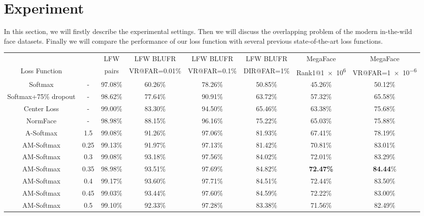 \documentclass[10pt,twocolumn,letterpaper]{article}
\begin{document}
\section{Experiment}

In this section, we will firstly describe the experimental settings. Then we will discuss the overlapping problem of the modern in-the-wild face datasets. Finally we will compare the performance of our loss function with several previous state-of-the-art loss functions.

\begin{table*}
	\centering
	\footnotesize
	\begin{threeparttable}
		\label{tab:performance}
		\begin{tabular}{cccccccc}
			\toprule
			& & LFW\cite{huang2007labeled} & LFW BLUFR\cite{liao2014benchmark} & LFW BLUFR\cite{liao2014benchmark} & LFW BLUFR\cite{liao2014benchmark} & MegaFace\cite{kemelmacher2016megaface} & MegaFace\cite{kemelmacher2016megaface} \\
			Loss Function &  &  pairs & VR@FAR=0.01\%  & VR@FAR=0.1\% & DIR@FAR=1\% & Rank1@\num{1e6} & VR@FAR=\num{1e-6} \\
			\midrule
			Softmax & - & 97.08\% & 60.26\% & 78.26\% & 50.85\% & 45.26\% & 50.12\% \\
			Softmax+75\% dropout & - & 98.62\% & 77.64\% & 90.91\% & 63.72\% & 57.32\% & 65.58\% \\
			Center Loss \cite{wen2016discriminative} & - & 99.00\% & 83.30\% & 94.50\% & 65.46\% & 63.38\% & 75.68\%\\
			NormFace \cite{wang2017normface} & - & 98.98\% & 88.15\% & 96.16\% & 75.22\% & 65.03\% & 75.88\%\\
			A-Softmax \cite{liu2017sphereface} & 1.5 & 99.08\% & 91.26\% & 97.06\% & 81.93\% & 67.41\% & 78.19\% \\
			\midrule
			AM-Softmax & 0.25 & 99.13\% & 91.97\% & 97.13\% & 81.42\% & 70.81\% & 83.01\%\\
			AM-Softmax & 0.3 & 99.08\% & 93.18\% & 97.56\% & 84.02\% & 72.01\% & 83.29\% \\
			AM-Softmax & 0.35 & 98.98\% & 93.51\% & 97.69\% & 84.82\% & \textbf{72.47\%} & \textbf{84.44}\% \\
			AM-Softmax & 0.4 & 99.17\% & 93.60\% & 97.71\% & 84.51\% & 72.44\% & 83.50\%\\
			AM-Softmax & 0.45 & 99.03\% & 93.44\% & 97.60\% & 84.59\% & 72.22\% & 83.00\% \\
			AM-Softmax & 0.5 & 99.10\% & 92.33\% & 97.28\% & 83.38\% & 71.56\% & 82.49\%\\

\end{tabular}
\end{threeparttable}
\end{table*}
\end{document}
